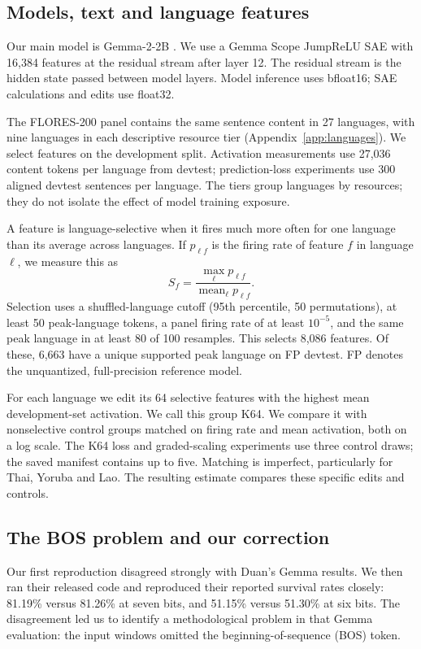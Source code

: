 \documentclass[11pt]{article}
\begin{document}
\subsection{Models, text and language features}
Our main model is Gemma-2-2B \citep{gemma2024}. We use a Gemma Scope JumpReLU SAE \citep{rajamanoharan2024} with 16,384 features at the residual stream after layer 12. The residual stream is the hidden state passed between model layers. Model inference uses bfloat16; SAE calculations and edits use float32.

The FLORES-200 panel \citep{nllb2022} contains the same sentence content in 27 languages, with nine languages in each descriptive resource tier (Appendix~\ref{app:languages}). We select features on the development split. Activation measurements use 27,036 content tokens per language from devtest; prediction-loss experiments use 300 aligned devtest sentences per language. The tiers group languages by resources; they do not isolate the effect of model training exposure.

A feature is language-selective when it fires much more often for one language than its average across languages. If $p_{\ell f}$ is the firing rate of feature $f$ in language $\ell$, we measure this as
\begin{equation}
 S_f=\frac{\max_\ell p_{\ell f}}{\operatorname{mean}_\ell p_{\ell f}}.
\end{equation}
Selection uses a shuffled-language cutoff (95th percentile, 50 permutations), at least 50 peak-language tokens, a panel firing rate of at least $10^{-5}$, and the same peak language in at least 80 of 100 resamples. This selects 8,086 features. Of these, 6,663 have a unique supported peak language on FP devtest. FP denotes the unquantized, full-precision reference model.

For each language we edit its 64 selective features with the highest mean development-set activation. We call this group K64. We compare it with nonselective control groups matched on firing rate and mean activation, both on a log scale. The K64 loss and graded-scaling experiments use three control draws; the saved manifest contains up to five. Matching is imperfect, particularly for Thai, Yoruba and Lao. The resulting estimate compares these specific edits and controls.

\subsection{The BOS problem and our correction}
Our first reproduction disagreed strongly with Duan's Gemma results. We then ran their released code and reproduced their reported survival rates closely: 81.19\% versus 81.26\% at seven bits, and 51.15\% versus 51.30\% at six bits. The disagreement led us to identify a methodological problem in that Gemma evaluation: the input windows omitted the beginning-of-sequence (BOS) token.
\end{document}
